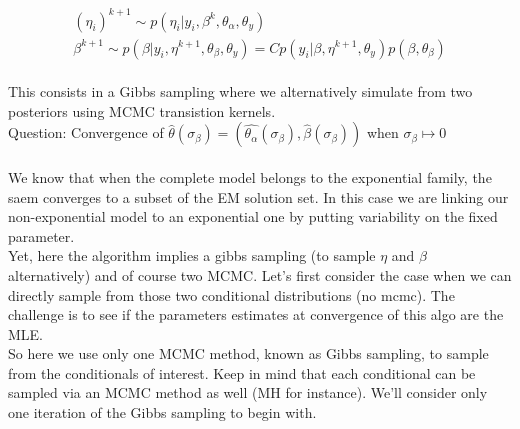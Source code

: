 \documentclass[a4paper]{article}
\begin{document}
\begin{align}
 (\eta_i)^{k+1} \sim p(\eta_i| y_i,\beta^k, \theta_{\alpha}, \theta_y) \\
 \beta^{k+1} \sim p(\beta| y_i,\eta^{k+1},\theta_{\beta},\theta_y) = C p(y_i|\beta,\eta^{k+1}, \theta_y) p(\beta,\theta_{\beta})
\end{align}\\

This consists in a Gibbs sampling where we alternatively simulate from two posteriors using MCMC transistion kernels.\\
Question: Convergence of $\hat{\theta}(\sigma_{\beta}) = (\hat{\theta_{\alpha}}(\sigma_{\beta}) , \hat{\beta}(\sigma_{\beta}) )$   when $\sigma_{\beta} \mapsto 0$\\
\\
We know that when the complete model belongs to the exponential family, the saem converges to a subset of the EM solution set. In this case we are linking our non-exponential model to an exponential one by putting variability on the fixed parameter.\\
Yet, here the algorithm implies a gibbs sampling (to sample $\eta$ and $\beta$ alternatively) and of course two MCMC. Let's first consider the case when we can directly sample from those two conditional distributions (no mcmc). The challenge is to see if the parameters estimates at convergence of this algo are the MLE.\\

So here we use only one MCMC method, known as Gibbs sampling, to sample from the conditionals of interest. Keep in mind that each conditional can be sampled via an MCMC method as well (MH for instance). We'll consider only one iteration of the Gibbs sampling to begin with.\\
\end{document}
